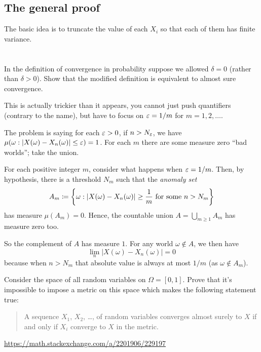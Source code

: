 \subsection{The general proof}

The basic idea is to truncate the value of each $X_i$ so that each of them has finite variance.


\section{\problemhead}
\begin{problem}
	\onechili
	In the definition of convergence in probability
	suppose we allowed $\delta = 0$
	(rather than $\delta > 0$).
	Show that the modified definition is
	equivalent to almost sure convergence.
	\begin{hint}
		This is actually trickier than it appears,
		you cannot just push quantifiers (contrary to the name),
		but have to focus on $\varepsilon = 1/m$ for $m = 1, 2, \dots$.

		The problem is saying for each $\varepsilon > 0$,
		if $n > N_\varepsilon$, we have
		$\mu(\omega : |X(\omega)-X_n(\omega)| \le \varepsilon) = 1$.
		For each $m$ there are some measure zero ``bad worlds'';
		take the union.
	\end{hint}
	\begin{sol}
		For each positive integer $m$,
		consider what happens when $\varepsilon = 1/m$.
		Then, by hypothesis, there is a threshold $N_m$
		such that the \emph{anomaly set}
		\[ A_m \coloneqq \left\{ \omega :
			|X(\omega)-X_n(\omega)| \ge \frac 1m
			\text{ for some } n > N_m \right\} \]
		has measure $\mu(A_m) = 0$.
		Hence, the countable union $A = \bigcup_{m \ge 1} A_m$ has measure zero too.

		So the complement of $A$ has measure $1$.
		For any world $\omega \notin A$,
		we then have
		\[ \lim_n \left\lvert X(\omega) - X_n(\omega) \right\rvert = 0 \]
		because when $n > N_m$ that absolute value
		is always at most $1/m$ (as $\omega \notin A_m$).
	\end{sol}
\end{problem}

\begin{problem}
	Consider the space of all random variables on $\Omega = [0,1]$.
	Prove that it's impossible to impose a metric on this space
	which makes the following statement true:
	\begin{quote}
		A sequence $X_1$, $X_2$, \dots, of random variables converges almost surely to $X$
		if and only if $X_i$ converge to $X$ in the metric.
	\end{quote}
	\begin{sol}
		\url{https://math.stackexchange.com/a/2201906/229197}
	\end{sol}
\end{problem}

